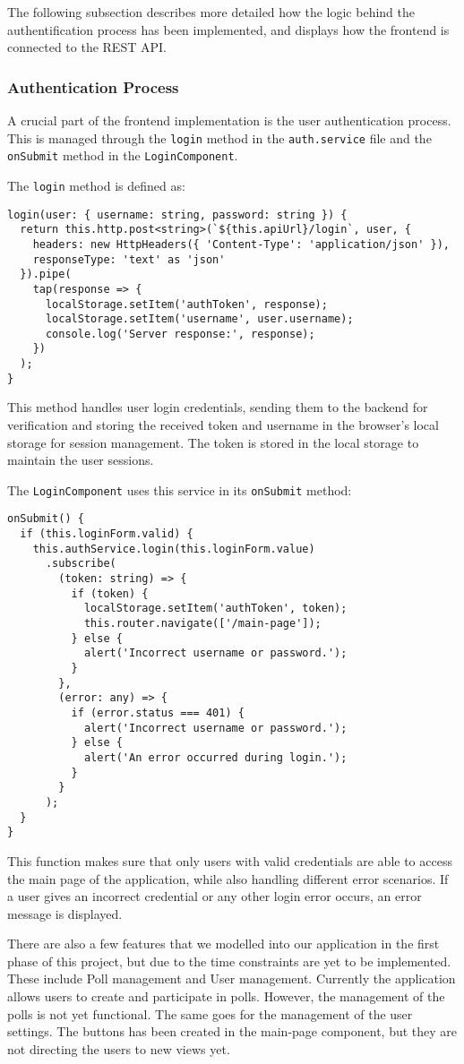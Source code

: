 The following subsection describes more detailed how the logic behind the authentification process has been implemented, 
and displays how the frontend is connected to the REST API. 

\subsubsection{Authentication Process}
A crucial part of the frontend implementation is the user authentication process. 
This is managed through the \texttt{login} method in the \texttt{auth.service} file and the \texttt{onSubmit} method in the \texttt{LoginComponent}.

The \texttt{login} method is defined as:
\begin{verbatim}
login(user: { username: string, password: string }) {
  return this.http.post<string>(`${this.apiUrl}/login`, user, {
    headers: new HttpHeaders({ 'Content-Type': 'application/json' }),
    responseType: 'text' as 'json'
  }).pipe(
    tap(response => {
      localStorage.setItem('authToken', response);
      localStorage.setItem('username', user.username);
      console.log('Server response:', response);
    })
  );
}
\end{verbatim}

This method handles user login credentials, sending them to the backend for verification and storing the received token and 
username in the browser's local storage for session management. The token is stored in the local storage to maintain the user sessions. 

The \texttt{LoginComponent} uses this service in its \texttt{onSubmit} method:
\begin{verbatim}
onSubmit() {
  if (this.loginForm.valid) {
    this.authService.login(this.loginForm.value)
      .subscribe(
        (token: string) => {
          if (token) {
            localStorage.setItem('authToken', token);
            this.router.navigate(['/main-page']);
          } else {
            alert('Incorrect username or password.');
          }
        },
        (error: any) => {
          if (error.status === 401) {
            alert('Incorrect username or password.');
          } else {
            alert('An error occurred during login.');
          }
        }
      );
  }
}
\end{verbatim}

This function makes sure that only users with valid credentials are able to access the main page of the application, while also handling 
different error scenarios. If a user gives an incorrect credential or any other login error occurs, an error message is displayed. 


There are also a few features that we modelled into our application in the first phase of this project,
but due to the time constraints are yet to be implemented. These include Poll management and User
management. Currently the application allows users to create and participate in polls. However, the
management of the polls is not yet functional. The same goes for the management of the user
settings. The buttons has been created in the main-page component, but they are not directing the
users to new views yet.